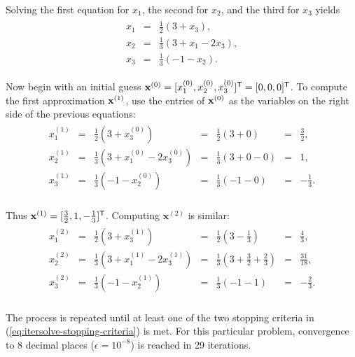 Solving the first equation for $x_1$, the second for $x_2$, and the third for $x_3$ yields
\begin{align*}
\begin{array}{ccc}
    x_1 & = & \frac{1}{2}(3 + x_3), \\
    x_2 & = & \frac{1}{3}(3 + x_1 - 2x_3), \\
    x_3 & = & \frac{1}{3}(-1 - x_2).
\end{array}
\end{align*}

Now begin with an initial guess $\mathbf{x}^{(0)} = [x^{(0)}_1, x^{(0)}_2, x^{(0)}_3]^{\mathsf T} = [0,0,0]^{\mathsf T}$.
To compute the first approximation $\mathbf{x}^{(1)}$, use the entries of $\mathbf{x}^{(0)}$ as the variables on the right side of the previous equations:
\begin{align*}
\begin{array}{ccccccr}
    x^{(1)}_1 & = & \frac{1}{2}(3 + x^{(0)}_3) & = & \frac{1}{2} (3 + 0) & = & \frac{3}{2}, \\
    x^{(1)}_2 & = & \frac{1}{3}(3 + x^{(0)}_1 - 2x^{(0)}_3) & = & \frac{1}{3} (3 + 0 - 0) & = & 1, \\
    x^{(1)}_3 & = & \frac{1}{3}(-1 - x^{(0)}_2) & = & \frac{1}{3} (-1 - 0) & = & -\frac{1}{3}. \\
\end{array}
\end{align*}

Thus $\mathbf{x}^{(1)} = [\frac{3}{2}, 1, -\frac{1}{3}]^{\mathsf T}$.
Computing $\mathbf{x}^{(2)}$ is similar:
\begin{align*}
\begin{array}{ccccccc}
x^{(2)}_1 & = & \frac{1}{2} ( 3 + x^{(1)}_3)  & = & \frac{1}{2} (3 - \frac{1}{3})     & = & \frac{4}{3}, \\
x^{(2)}_2 & = & \frac{1}{3} ( 3 + x^{(1)}_1 - 2x^{(1)}_3) & = & \frac{1}{3} (3 + \frac{3}{2} + \frac{2}{3}) & = &  \frac{31}{18}, \\
x^{(2)}_3 & = & \frac{1}{3} ( -1 - x^{(1)}_2)       & = & \frac{1}{3} (-1 - 1)    & = & -\frac{2}{3}. \\
\end{array}
\end{align*}

The process is repeated until at least one of the two stopping criteria in (\ref{eq:itersolve-stopping-criteria}) is met.
For this particular problem, convergence to 8 decimal places ($\epsilon = 10^{-8}$) is reached in 29 iterations.

